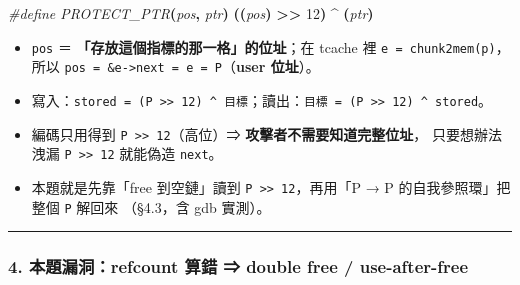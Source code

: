 \documentclass[10pt,a4paper]{article}
\newenvironment{Shaded}{\begin{snugshade}}{\end{snugshade}}
\newcommand{\DecValTok}[1]{\textcolor[rgb]{0.00,0.00,0.81}{#1}}
\newcommand{\OperatorTok}[1]{\textcolor[rgb]{0.81,0.36,0.00}{\textbf{#1}}}
\newcommand{\PreprocessorTok}[1]{\textcolor[rgb]{0.56,0.35,0.01}{\textit{#1}}}
\renewenvironment{Shaded}{%
  \def\FrameCommand{\fboxsep=3.2pt\colorbox{shadecolor}}%
  \MakeFramed{\advance\hsize-\width\FrameRestore\small}%
}{%
  \endMakeFramed
}
\providecommand{\tightlist}{%
  \setlength{\itemsep}{0pt}\setlength{\parskip}{0pt}}
\begin{document}
\begin{Shaded}
\begin{Highlighting}[]
\PreprocessorTok{\#define PROTECT\_PTR}\OperatorTok{(}\PreprocessorTok{pos}\OperatorTok{,}\PreprocessorTok{ ptr}\OperatorTok{)}\PreprocessorTok{  }\OperatorTok{((}\PreprocessorTok{pos}\OperatorTok{)}\PreprocessorTok{ }\OperatorTok{\textgreater{}\textgreater{}}\PreprocessorTok{ }\DecValTok{12}\OperatorTok{)}\PreprocessorTok{ }\OperatorTok{\^{}}\PreprocessorTok{ }\OperatorTok{(}\PreprocessorTok{ptr}\OperatorTok{)}
\end{Highlighting}
\end{Shaded}

\begin{itemize}
\tightlist
\item
  \texttt{pos} ＝ \textbf{「存放這個指標的那一格」的位址}；在 tcache 裡
  \texttt{e\ \allowbreak{}=\ \allowbreak{}chunk2mem(p)}， 所以
  \texttt{pos\ \allowbreak{}=\ \allowbreak{}\&\allowbreak{}e-\allowbreak{}\textgreater{}\allowbreak{}next\ \allowbreak{}=\ \allowbreak{}e\ \allowbreak{}=\ \allowbreak{}P}（\textbf{user
  位址}）。
\item
  寫入：\texttt{stored\ \allowbreak{}=\ \allowbreak{}(P\ \allowbreak{}\textgreater{}\allowbreak{}\textgreater{}\allowbreak{}\ \allowbreak{}12)\ \allowbreak{}\^\allowbreak{}{}\allowbreak{}\ \allowbreak{}目標}；讀出：\texttt{目標\ \allowbreak{}=\ \allowbreak{}(P\ \allowbreak{}\textgreater{}\allowbreak{}\textgreater{}\allowbreak{}\ \allowbreak{}12)\ \allowbreak{}\^\allowbreak{}{}\allowbreak{}\ \allowbreak{}stored}。
\item
  編碼只用得到 \texttt{P\ \allowbreak{}\textgreater{}\allowbreak{}\textgreater{}\allowbreak{}\ \allowbreak{}12}（高位）⇒
  \textbf{攻擊者不需要知道完整位址}， 只要想辦法洩漏
  \texttt{P\ \allowbreak{}\textgreater{}\allowbreak{}\textgreater{}\allowbreak{}\ \allowbreak{}12} 就能偽造 \texttt{next}。
\item
  本題就是先靠「free 到空鏈」讀到
  \texttt{P\ \allowbreak{}\textgreater{}\allowbreak{}\textgreater{}\allowbreak{}\ \allowbreak{}12}，再用「P → P
  的自我參照環」把整個 \texttt{P} 解回來 （§4.3，含 gdb 實測）。
\end{itemize}

\begin{center}\rule{0.5\linewidth}{0.5pt}\end{center}

\subsubsection{4. 本題漏洞：refcount 算錯 ⇒ double free /
use-after-free}\label{ux672cux984cux6f0fux6d1erefcount-ux7b97ux932f-double-free-use-after-free}
\end{document}
